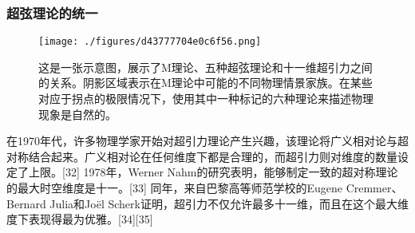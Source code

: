\subsubsection{超弦理论的统一}
\begin{figure}[ht]
\centering
\texttt{[image: ./figures/d43777704e0c6f56.png]}
\caption{这是一张示意图，展示了M理论、五种超弦理论和十一维超引力之间的关系。阴影区域表示在M理论中可能的不同物理情景家族。在某些对应于拐点的极限情况下，使用其中一种标记的六种理论来描述物理现象是自然的。} \label{fig_String_7}
\end{figure}
在1970年代，许多物理学家开始对超引力理论产生兴趣，该理论将广义相对论与超对称结合起来。广义相对论在任何维度下都是合理的，而超引力则对维度的数量设定了上限。[32] 1978年，Werner Nahm的研究表明，能够制定一致的超对称理论的最大时空维度是十一。[33] 同年，来自巴黎高等师范学校的Eugene Cremmer、Bernard Julia和Joël Scherk证明，超引力不仅允许最多十一维，而且在这个最大维度下表现得最为优雅。[34][35]

